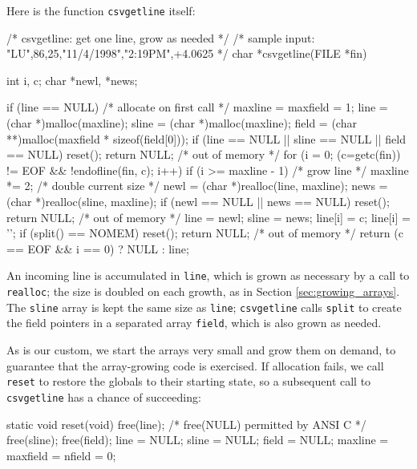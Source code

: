 Here is the function \verb'csvgetline' itself:
\begin{wellcode}
    /* csvgetline: get one line, grow as needed */
    /* sample input: "LU",86,25,"11/4/1998","2:19PM",+4.0625 */
    char *csvgetline(FILE *fin)
    {
        int     i, c;
        char    *newl, *news;

        if (line == NULL) {     /* allocate on first call */
            maxline = maxfield = 1;
            line = (char *)malloc(maxline);
            sline = (char *)malloc(maxline);
            field = (char **)malloc(maxfield * sizeof(field[0]));
            if (line == NULL || sline == NULL || field == NULL) {
                reset();
                return NULL;    /* out of memory */
            }
        }
        for (i = 0; (c=getc(fin)) != EOF && !endofline(fin, c); i++) {
            if (i >= maxline - 1) { /* grow line */
                maxline *= 2;       /* double current size */
                newl = (char *)realloc(line, maxline);
                news = (char *)realloc(sline, maxline);
                if (newl == NULL || news == NULL) {
                    reset();
                    return NULL;    /* out of memory */
                }
                line = newl;
                sline = news;
            }
            line[i] = c;
        }
        line[i] = '\0';
        if (split() == NOMEM) {
            reset();
            return NULL;    /* out of memory */
        }
        return (c == EOF && i == 0) ? NULL : line;
    }
\end{wellcode}
An incoming line is accumulated in \verb'line', which is grown as necessary
by a call to \verb'realloc'; the size is doubled on each growth, as in
Section \ref{sec:growing_arrays}. The \verb'sline' array is kept the same
size as \verb'line'; \verb'csvgetline' calls \verb'split' to create the
field pointers in a separated array \verb'field', which is also grown as
needed.

As is our custom, we start the arrays very small and grow them on demand,
to guarantee that the array-growing code is exercised. If allocation fails,
we call \verb'reset' to restore the globals to their starting state, so a
subsequent call to \verb'csvgetline' has a chance of succeeding:
\begin{wellcode}
    static void reset(void)
    {
        free(line); /* free(NULL) permitted by ANSI C */
        free(sline);
        free(field);
        line = NULL;
        sline = NULL;
        field = NULL;
        maxline = maxfield = nfield = 0;
    }
\end{wellcode}

